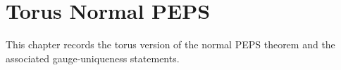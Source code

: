 
\chapter{Torus Normal PEPS}%
\label{ch:peps_torus}

This chapter records the torus version of the normal PEPS theorem and the
associated gauge-uniqueness statements.


